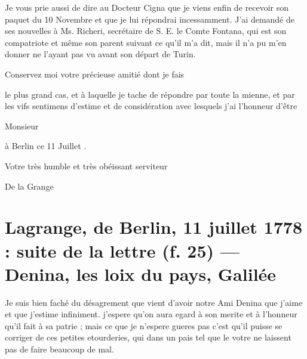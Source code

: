 \documentclass[11pt,a4paper]{article}
\begin{document}

Je vous prie aussi de dire au Docteur Cigna que je viens enfin de recevoir
son paquet du 10 Novembre et que je lui répondrai incessamment. J'ai demandé
de ses nouvelles à Ms. Richeri, secrétaire de S. E. le Comte Fontana, qui est
son compatriote et même son parent suivant ce qu'il m'a dit, mais il n'a pu
m'en donner ne l'ayant pas vu \struck{\ill{}} avant son départ de Turin.

Conservez moi votre précieuse amitié dont je fais

le plus grand cas, et à laquelle je tache de répondre par toute la mienne, et
par les vifs sentimens d'estime et de considération avec lesquels j'ai
l'honneur d'être

Monsieur

à Berlin ce 11 Juillet .

Votre très humble et très obéissant serviteur

De la Grange


\section{Lagrange, de Berlin, 11 juillet 1778 : suite de la lettre (f. 25) — Denina, les loix du pays, Galilée}

Je suis bien faché du désagrement que vient d'avoir notre Ami Denina que
j'aime et que j'estime infiniment. j'espere qu'on aura egard à son merite et
à l'honneur qu'il fait à sa patrie ; mais ce que je n'espere gueres pas c'est
qu'il puisse se corriger de ces petites etourderies, qui dans un pais tel que
le votre ne laissent pas de faire beaucoup de mal.
\end{document}
